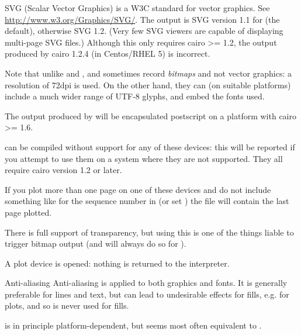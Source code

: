 \begin{Details}\relax
SVG (Scalar Vector Graphics) is a W3C standard for vector graphics.
See \url{http://www.w3.org/Graphics/SVG/}.  The output is SVG version
1.1 for  (the default), otherwise SVG 1.2.  (Very few
SVG viewers are capable of displaying multi-page SVG files.)  Although
this only requires cairo >= 1.2, the output produced by cairo 1.2.4
(in Centos/RHEL 5) is incorrect.

Note that unlike  and ,
 and  sometimes record \emph{bitmaps}
and not vector graphics: a resolution of 72dpi is used.  On the other
hand, they can (on suitable platforms) include a much wider range of
UTF-8 glyphs, and embed the fonts used.

The output produced by  will be
encapsulated postscript on a platform with cairo >= 1.6.

\R{} can be compiled without support for any of these
devices: this will be reported if you attempt to use them on a system
where they are not supported.  They all require cairo version 1.2 or
later.

If you plot more than one page on one of these devices and do not
include something like  for the sequence number in
 (or set ) the file will contain the
last page plotted.

There is full support of transparency, but using this is one of the
things liable to trigger bitmap output (and will always do so for
).
\end{Details}
%
\begin{Value}
A plot device is opened: nothing is returned to the \R{} interpreter.
\end{Value}
%
\begin{Section}{Anti-aliasing}
Anti-aliasing is applied to both graphics and fonts.  It is generally
preferable for lines and text, but can lead to undesirable effects for
fills, e.g. for  plots, and so is never used for
fills.

 is in principle platform-dependent, but
seems most often equivalent to .
\end{Section}
%
